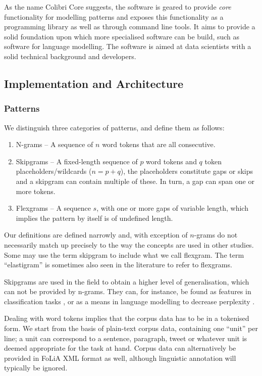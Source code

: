 \documentclass[a4paper,12pt]{article}
\begin{document}
As the name Colibri Core suggests, the software is geared to provide
\emph{core} functionality for modelling patterns and exposes this functionality
as a programming library as well as through command line tools. It aims to
provide a solid foundation upon which more specialised software can be build,
such as software for language modelling. The software is aimed at
data scientists with a solid technical background and developers. 


\subsection{Implementation and Architecture}

\subsubsection{Patterns}

We distinguish three categories of patterns, and define them as follows:

\begin{enumerate}
    \item N-grams -- A sequence of $n$ word tokens that are all consecutive.
    \item Skipgrams -- A fixed-length sequence of $p$ word tokens and $q$ token placeholders/wildcards ($n=p+q$), the placeholders constitute gaps or skips and a skipgram can contain multiple of these. In turn, a gap can span one or more tokens. 
    \item Flexgrams -- A sequence $s$, with one or more gaps of variable length, which implies the pattern by itself is of undefined length.
\end{enumerate}

Our definitions are defined narrowly and, with exception of $n$-grams do not
necessarily match up precisely to the way the concepts are used in other studies. Some
may use the term skipgram to include what we call flexgram.  The term
``elastigram'' is sometimes also seen in the literature to refer to flexgrams. 

Skipgrams are used in the field to obtain a higher level of generalisation, which
can not be provided by n-grams. They can, for instance, be found as features in
classification tasks \citep{DHONDT}, or as a means in language modelling to
decrease perplexity \citep{Guthrie06}.

Dealing with word tokens implies that the corpus data has to be in a
tokenised form. We start from the basis of plain-text corpus data, containing one
``unit'' per line; a unit can correspond to a sentence, paragraph, tweet
or whatever unit is deemed appropriate for the task at hand. Corpus data can
alternatively be provided in FoLiA XML format \cite{FOLIAPAPER} as well, although linguistic
annotation will typically be ignored.
\end{document}
